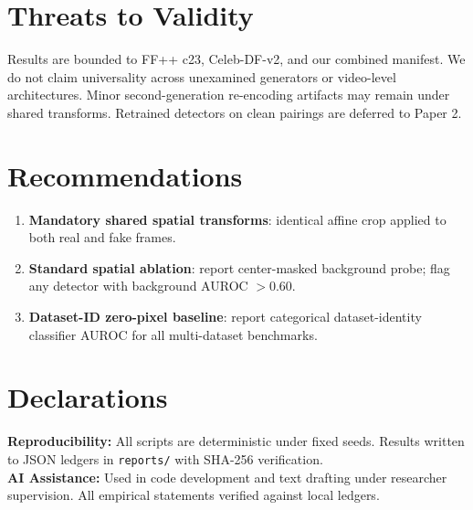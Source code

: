 \documentclass[10pt,twocolumn]{article}
\begin{document}
\section{Threats to Validity}

Results are bounded to FF++ c23, Celeb-DF-v2, and our combined manifest.
We do not claim universality across unexamined generators or video-level architectures.
Minor second-generation re-encoding artifacts may remain under shared transforms.
Retrained detectors on clean pairings are deferred to Paper 2.

\section{Recommendations}

\begin{enumerate}[leftmargin=*,label=\arabic*.]
\item \textbf{Mandatory shared spatial transforms}: identical affine crop applied to both real and fake frames.
\item \textbf{Standard spatial ablation}: report center-masked background probe; flag any detector with background AUROC $> 0.60$.
\item \textbf{Dataset-ID zero-pixel baseline}: report categorical dataset-identity classifier AUROC for all multi-dataset benchmarks.
\end{enumerate}

\section*{Declarations}

\textbf{Reproducibility:} All scripts are deterministic under fixed seeds. Results written to JSON ledgers in \texttt{reports/} with SHA-256 verification. \\
\textbf{AI Assistance:} Used in code development and text drafting under researcher supervision. All empirical statements verified against local ledgers.



\end{document}
